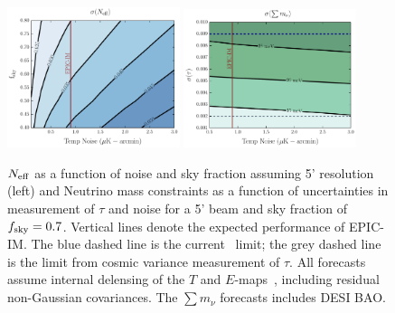 
\begin{figure}[t!]
\begin{center}
\includegraphics[width=0.45\textwidth]{figs/Neff.pdf}
\includegraphics[width=0.45\textwidth]{figs/Mnu_tauprior.pdf}
\caption{ \small \setlength{\baselineskip}{0.95\baselineskip}
${N_{\rm eff}}$ as a function of noise and sky fraction assuming 5' resolution (left) and
Neutrino mass constraints as a function of uncertainties in measurement of $\tau$ and noise for a 5' beam and 
sky fraction of $f_{\rm sky} = 0.7$. 
Vertical lines denote the expected performance of EPIC-IM. 
The blue dashed line is the current \planck~limit; the grey dashed line is the limit from cosmic variance 
measurement of $\tau$. All forecasts assume internal delensing of the $T$ and $E$-maps~\cite{Green:2016cjr}, including residual non-Gaussian covariances.  The $\sum m_\nu$ forecasts includes DESI BAO.  
\label{fig:Neff_future} }
\end{center}
\vspace{-0.15in}
\end{figure}

